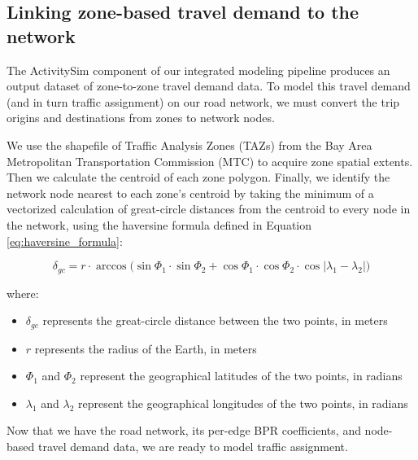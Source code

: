 \subsection{Linking zone-based travel demand to the network}

The ActivitySim component of our integrated modeling pipeline produces an output dataset of zone-to-zone travel demand data. To model this travel demand (and in turn traffic assignment) on our road network, we must convert the trip origins and destinations from zones to network nodes.

We use the shapefile of Traffic Analysis Zones (TAZs) from the Bay Area Metropolitan Transportation Commission (MTC) to acquire zone spatial extents. Then we calculate the centroid of each zone polygon. Finally, we identify the network node nearest to each zone's centroid by taking the minimum of a vectorized calculation of great-circle distances from the centroid to every node in the network, using the haversine formula defined in Equation \ref{eq:haversine_formula}:

 
\begin{equation}
    \delta_{gc} = r\cdot \arccos{(\sin{\Phi_1}\cdot\sin{\Phi_2} + \cos{\Phi_1}}\cdot\cos{\Phi_2}\cdot\cos{|\lambda_1 - \lambda_2|})
    \label{eq:haversine_formula}
\end{equation}

where:

\begin{itemize}
    \item $\delta_{gc}$ represents the great-circle distance between the two points, in meters
    \item $r$ represents the radius of the Earth, in meters
    \item $\Phi_1$ and $\Phi_2$ represent the geographical latitudes of the two points, in radians
    \item $\lambda_1$ and $\lambda_2$ represent the geographical longitudes of the two points, in radians
\end{itemize}

Now that we have the road network, its per-edge BPR coefficients, and node-based travel demand data, we are ready to model traffic assignment.
